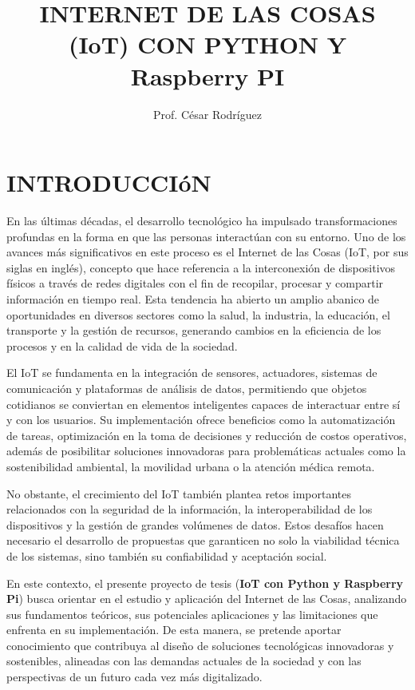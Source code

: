 \documentclass{report}
\title{INTERNET DE LAS COSAS (IoT) CON PYTHON Y Raspberry PI}
\author{Prof. César Rodríguez}
\date{}
\begin{document}
\maketitle
\tableofcontents

\chapter{INTRODUCCIóN}
En las últimas décadas, el desarrollo tecnológico ha impulsado transformaciones profundas en la forma en que las personas 
interactúan con su entorno. Uno de los avances más significativos en este proceso es el Internet de las Cosas 
(IoT, por sus siglas en inglés), concepto que hace referencia a la interconexión de dispositivos físicos a través de redes 
digitales con el fin de recopilar, procesar y compartir información en tiempo real. Esta tendencia ha abierto un amplio 
abanico de oportunidades en diversos sectores como la salud, la industria, la educación, el transporte y la gestión de recursos, 
generando cambios en la eficiencia de los procesos y en la calidad de vida de la sociedad.

El IoT se fundamenta en la integración de sensores, actuadores, sistemas de comunicación y plataformas de análisis de datos, 
permitiendo que objetos cotidianos se conviertan en elementos inteligentes capaces de interactuar entre sí y con los usuarios. 
Su implementación ofrece beneficios como la automatización de tareas, optimización en la toma de decisiones y reducción de 
costos operativos, además de posibilitar soluciones innovadoras para problemáticas actuales como la sostenibilidad ambiental, 
la movilidad urbana o la atención médica remota.

No obstante, el crecimiento del IoT también plantea retos importantes relacionados con la seguridad de la información, la 
interoperabilidad de los dispositivos y la gestión de grandes volúmenes de datos. Estos desafíos hacen necesario el desarrollo 
de propuestas que garanticen no solo la viabilidad técnica de los sistemas, sino también su confiabilidad y aceptación social.

En este contexto, el presente proyecto de tesis (\textbf{IoT con Python y Raspberry Pi}) busca orientar en el estudio y aplicación 
del Internet de las Cosas, analizando sus fundamentos teóricos, sus potenciales aplicaciones y las limitaciones que enfrenta 
en su implementación. De esta manera, se pretende aportar conocimiento que contribuya al diseño de soluciones tecnológicas 
innovadoras y sostenibles, alineadas con las demandas actuales de la sociedad y con las perspectivas de un futuro cada vez 
más digitalizado.
\end{document}
